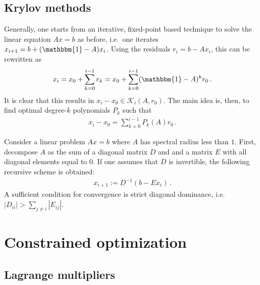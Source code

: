 \subsection{Krylov methods}

    Generally, one starts from an iterative, fixed-point based technique to solve the linear equation $Ax=b$ as before, i.e.~one iterates $x_{i+1}=b+(\mathbbm{1}-A)x_i$. Using the residuals $r_i=b-Ax_i$, this can be rewritten as
    \begin{gather}
        x_i = x_0 + \sum_{k=0}^{i-1}r_k = x_0 + \sum_{k=0}^{i-1}(\mathbbm{1}-A)^kr_0\,.
    \end{gather}
    It is clear that this results in $x_i-x_0\in\mathcal{K}_i(A,r_0)$. The main idea is, then, to find optimal degree-$k$ polynomials $P_k$ such that
    \begin{gather}
        x_i-x_0=\sum_{k=0}^{i-1}P_k(A)r_0\,.
    \end{gather}

    \begin{method}
        Consider a linear problem $Ax=b$ where $A$ has spectral radius less than $1$. First, decompose $A$ as the sum of a diagonal matrix $D$ and and a matrix $E$ with all diagonal elements equal to 0. If one assumes that $D$ is invertible, the following recursive scheme is obtained:
        \begin{gather}
            x_{i+1} := D^{-1}(b-Ex_i)\,.
        \end{gather}
        A sufficient condition for convergence is strict diagonal dominance, i.e.~$|D_{ii}|>\sum_{j\neq i}|E_{ij}|$.
    \end{method}


\section{Constrained optimization}
\subsection{Lagrange multipliers}\label{section:lagrange_multipliers}

